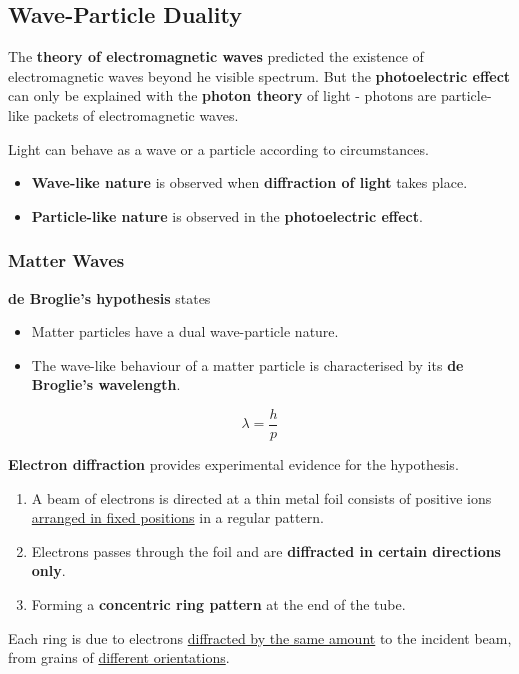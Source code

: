 \subsection{Wave-Particle Duality}

The \textbf{theory of electromagnetic waves} predicted the existence of electromagnetic waves beyond he visible spectrum. But the \textbf{photoelectric effect} can only be explained with the \textbf{photon theory} of light - photons are particle-like packets of electromagnetic waves.

Light can behave as a wave or a particle according to circumstances.
\begin{itemize}
    \item \textbf{Wave-like nature} is observed when \textbf{diffraction of light} takes place.
    \item \textbf{Particle-like nature} is observed in the \textbf{photoelectric effect}.
\end{itemize}

\subsubsection*{Matter Waves}
\textbf{de Broglie's hypothesis} states
\begin{itemize}
    \item Matter particles have a dual wave-particle nature.
    \item The wave-like behaviour of a matter particle is characterised by its \textbf{de Broglie's wavelength}.
\end{itemize}
$$\lambda=\frac{h}{p}$$

\textbf{Electron diffraction} provides experimental evidence for the hypothesis.
\begin{enumerate}
    \item A beam of electrons is directed at a thin metal foil consists of positive ions \underline{arranged in fixed positions} in a regular pattern.

    \item Electrons passes through the foil and are \textbf{diffracted in certain directions only}.
    \item Forming a \textbf{concentric ring pattern} at the end of the tube.
\end{enumerate}
Each ring is due to electrons \underline{diffracted by the same amount} to the incident beam, from grains of \underline{different orientations}.

